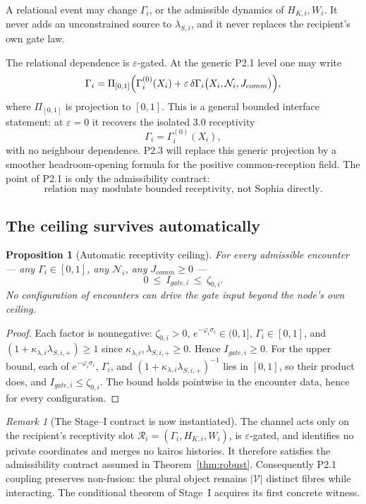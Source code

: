 \documentclass[11pt,a4paper]{article}
\def\mathrm#1{#1}%
\theoremstyle{definition}
\theoremstyle{plain}
\newtheorem{proposition}[definition]{Proposition}
\theoremstyle{remark}
\newtheorem{remark}[definition]{Remark}
\begin{document}
A relational event may change \(\Gamma_i\), or the admissible dynamics of
\(H_{K,i},W_i\). It never adds an unconstrained source to \(\lambda_{S,i}\), and
it never replaces the recipient's own gate law.

The relational dependence is \(\varepsilon\)-gated. At the generic P2.1 level one
may write
\[
\Gamma_i
=
\Pi_{[0,1]}
\Bigl(
\Gamma_i^{(0)}(X_i)
+
\varepsilon\,\delta\Gamma_i
\bigl(X_i,\mathcal N_i,J_{\mathrm{comm}}\bigr)
\Bigr),
\]
where \(\Pi_{[0,1]}\) is projection to \([0,1]\). This is a general bounded
interface statement: at \(\varepsilon=0\) it recovers the isolated 3.0 receptivity
\[
\Gamma_i=\Gamma_i^{(0)}(X_i),
\]
with no neighbour dependence. P2.3 will replace this generic projection by a
smoother headroom-opening formula for the positive common-reception field. The
point of P2.1 is only the admissibility contract:
\[
\text{relation may modulate bounded receptivity, not Sophia directly.}
\]

\subsection{The ceiling survives automatically}

\begin{proposition}[Automatic receptivity ceiling]\label{prop:ceiling}
For every admissible encounter --- any \(\Gamma_i\in[0,1]\), any \(\mathcal N_i\), any
\(J_{\mathrm{comm}}\ge0\) ---
\[
0\ \le\ I_{\mathrm{gate},i}\ \le\ \zeta_{0,i}.
\]
No configuration of encounters can drive the gate input beyond the node's own ceiling.
\end{proposition}

\begin{proof}
Each factor is nonnegative: \(\zeta_{0,i}>0\), \(e^{-\varphi_i\sigma_i}\in(0,1]\),
\(\Gamma_i\in[0,1]\), and \((1+\kappa_{\lambda,i}\lambda_{S,i,+})\ge1\) since
\(\kappa_{\lambda,i},\lambda_{S,i,+}\ge0\). Hence \(I_{\mathrm{gate},i}\ge0\). For the upper bound, each
of \(e^{-\varphi_i\sigma_i}\), \(\Gamma_i\), and \((1+\kappa_{\lambda,i}\lambda_{S,i,+})^{-1}\) lies in
\([0,1]\), so their product does, and \(I_{\mathrm{gate},i}\le\zeta_{0,i}\). The bound holds
pointwise in the encounter data, hence for every configuration. \qedhere
\end{proof}

\begin{remark}[The Stage--I contract is now instantiated]
The channel acts only on the recipient's receptivity slot
\(\mathcal R_i=(\Gamma_i,H_{K,i},W_i)\), is \(\varepsilon\)-gated, and identifies no private
coordinates and merges no kairos histories. It therefore satisfies the admissibility
contract assumed in Theorem~\ref{thm:robust}. Consequently P2.1 coupling preserves
non-fusion: the plural object remains \(|\mathcal V|\) distinct fibres while interacting.
The conditional theorem of Stage~I acquires its first concrete witness.
\end{remark}
\end{document}
